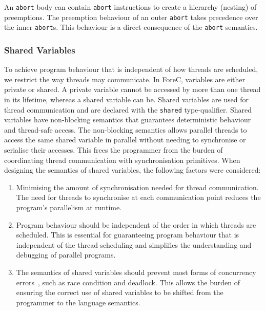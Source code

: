 An \verb$abort$ body can contain \verb$abort$ instructions to 
create a hierarchy (nesting) of preemptions. The preemption
behaviour of an outer \verb$abort$ takes precedence over the inner 
\verb$abort$s. This behaviour is a direct consequence of the 
\verb$abort$ semantics.



\subsubsection{Shared Variables}
To achieve program behaviour that is independent of how threads are 
scheduled, we restrict the way threads may communicate. In ForeC,
variables are either private or shared. A private variable cannot 
be accessed by more than one thread in its lifetime, whereas 
a shared variable can be. Shared variables are used for thread 
communication and are declared with the \verb$shared$ type-qualifier. 
Shared variables have non-blocking semantics that guarantees
deterministic behaviour and thread-safe access. The non-blocking
semantics allows parallel threads to access the same shared variable 
in parallel without needing to synchronise or serialise their 
accesses. This frees the programmer from the burden of coordinating
thread communication with synchronisation primitives. 
When designing the semantics of shared variables, the following 
factors were considered:
\begin{enumerate}
	\item Minimising the amount of synchronisation needed for thread 
		  communication. The need for threads to synchronise at each
		  communication point reduces the program's parallelism at runtime.
	\item Program behaviour should be independent of the order in which 
		  threads are scheduled. This is essential for guaranteeing program
		  behaviour that is independent of the thread scheduling and 
		  simplifies the understanding and debugging of parallel programs.
	\item The semantics of shared variables should prevent most forms of
		  concurrency errors~\cite{multiprocessing_problem_threads, 
		  multiprocessing_debugging_concurrency, multiprocessing_debugging_concurrency_study}, 
		  such as race condition and deadlock. This allows the burden of 
		  ensuring the correct use of shared variables to be shifted from 
		  the programmer to the language semantics. 
\end{enumerate}
